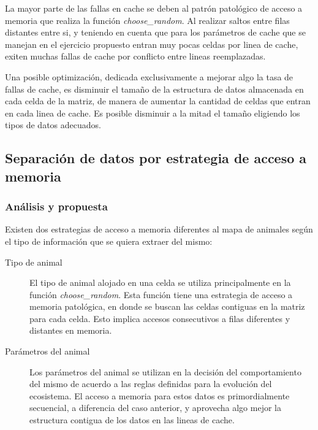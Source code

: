 \documentclass[a4paper,11pt]{article}
\begin{document}
La mayor parte de las fallas en cache se deben al patrón patológico de acceso a
memoria que realiza la función \textit{choose\_random}. Al realizar saltos
entre filas distantes entre si, y teniendo en cuenta que para los parámetros de
cache que se manejan en el ejercicio propuesto entran muy pocas celdas por
linea de cache, exiten muchas fallas de cache por conflicto entre lineas
reemplazadas.

Una posible optimización, dedicada exclusivamente a mejorar algo la tasa de
fallas de cache, es disminuir el tamaño de la estructura de datos almacenada en
cada celda de la matriz, de manera de aumentar la cantidad de celdas que entran
en cada linea de cache. Es posible disminuir a la mitad el tamaño eligiendo los
tipos de datos adecuados.

\subsection{Separación de datos por estrategia de acceso a memoria}

\subsubsection{Análisis y propuesta}

Existen dos estrategias de acceso a memoria diferentes al mapa de animales según el tipo de información que se quiera extraer del mismo:

\begin{description}

    \item[Tipo de animal] El tipo de animal alojado en una celda se utiliza
        principalmente en la función \textit{choose\_random}. Esta función
        tiene una estrategia de acceso a memoria patológica, en donde se buscan
        las celdas contiguas en la matriz para cada celda. Esto implica accesos
        consecutivos a filas diferentes y distantes en memoria.

    \item[Parámetros del animal] Los parámetros del animal se utilizan en la
        decisión del comportamiento del mismo de acuerdo a las reglas definidas
        para la evolución del ecosistema. El acceso a memoria para estos datos
        es primordialmente secuencial, a diferencia del caso anterior, y
        aprovecha algo mejor la estructura contigua de los datos en las lineas
        de cache.

\end{description}
\end{document}
